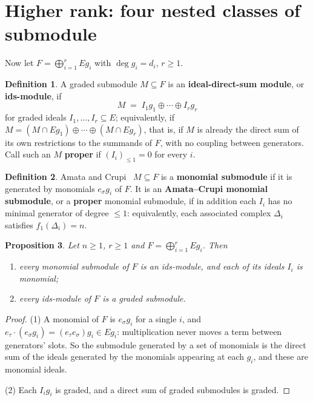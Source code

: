 \documentclass[11pt, a4paper, abstract=yes]{scrartcl}
\theoremstyle{definition}
\newtheorem{definition}{Definition}
\theoremstyle{remark}
\theoremstyle{plain}
\newtheorem{proposition}[definition]{Proposition}
\begin{document}
\section{Higher rank: four nested classes of submodule}
\label{sec-hierarchy}
Now let \(F=\bigoplus_{i=1}^rEg_i\) with \(\deg g_i=d_i\), \(r\ge1\).

\begin{definition}
A graded submodule \(M\subseteq F\) is an \textbf{ideal-direct-sum module}, or \textbf{ids-module}, if
\begin{equation}\label{eq:ids}
  M \;=\; I_1g_1\oplus\cdots\oplus I_rg_r
\end{equation}
for graded ideals \(I_1,\dots,I_r\subseteq E\); equivalently, if
\(M=(M\cap Eg_1)\oplus\cdots\oplus(M\cap Eg_r)\), that is, if \(M\) is already the direct sum of its
own restrictions to the summands of \(F\), with no coupling between generators. Call such an \(M\)
\textbf{proper} if \((I_i)_{\le1}=0\) for every \(i\).
\label{def:ids}
\label{def-ids}
\end{definition}

\begin{definition}
Amata and Crupi~\cite[Definition 2.1]{AmataCrupi2020} \(M\subseteq F\) is a \textbf{monomial submodule} if it is generated
by monomials \(e_\sigma g_i\) of \(F\). It is an \textbf{Amata--Crupi monomial submodule}, or a \textbf{proper}
monomial submodule, if in addition each \(I_i\) has no minimal generator of degree \(\le1\):
equivalently, each associated complex \(\Delta_i\) satisfies \(f_1(\Delta_i)=n\).
\label{def-monomial-submodule}
\end{definition}

\begin{proposition}
Let \(n\ge1\), \(r\ge1\) and \(F=\bigoplus_{i=1}^rEg_i\). Then
\begin{enumerate}
\item every monomial submodule of \(F\) is an ids-module, and each of its ideals \(I_i\) is monomial;
\item every ids-module of \(F\) is a graded submodule.
\end{enumerate}
\label{prop-hierarchy}
\end{proposition}

\begin{proof}
(1) A monomial of \(F\) is \(e_\sigma g_i\) for a single \(i\), and
\(e_\tau\cdot(e_\sigma g_i)=(e_\tau e_\sigma)g_i\in Eg_i\): multiplication never moves a term between
generators' slots. So the submodule generated by a set of monomials is the direct sum of the ideals
generated by the monomials appearing at each \(g_i\), and these are monomial ideals.

(2) Each \(I_ig_i\) is graded, and a direct sum of graded submodules is graded.
\end{proof}
\end{document}
